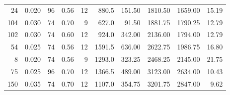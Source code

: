 \begin{table}[ht]
\begin{tabular}{rrrrrrrrrr}
  24 & 0.020 & 96 & 0.56 & 12 & 880.5 & 151.50 & 1810.50 & 1659.00 & 15.19 \\ 
  104 & 0.030 & 74 & 0.70 & 9 & 627.0 & 91.50 & 1881.75 & 1790.25 & 12.79 \\ 
  102 & 0.030 & 74 & 0.60 & 12 & 924.0 & 342.00 & 2136.00 & 1794.00 & 12.79 \\ 
  54 & 0.025 & 74 & 0.56 & 12 & 1591.5 & 636.00 & 2622.75 & 1986.75 & 16.80 \\ 
  8 & 0.020 & 74 & 0.56 & 9 & 1293.0 & 323.25 & 2468.25 & 2145.00 & 21.75 \\ 
  75 & 0.025 & 96 & 0.70 & 12 & 1366.5 & 489.00 & 3123.00 & 2634.00 & 10.43 \\ 
  150 & 0.035 & 74 & 0.70 & 12 & 1107.0 & 354.75 & 3201.75 & 2847.00 & 9.62 \\ 
   \hline
\end{tabular}
\end{table}
